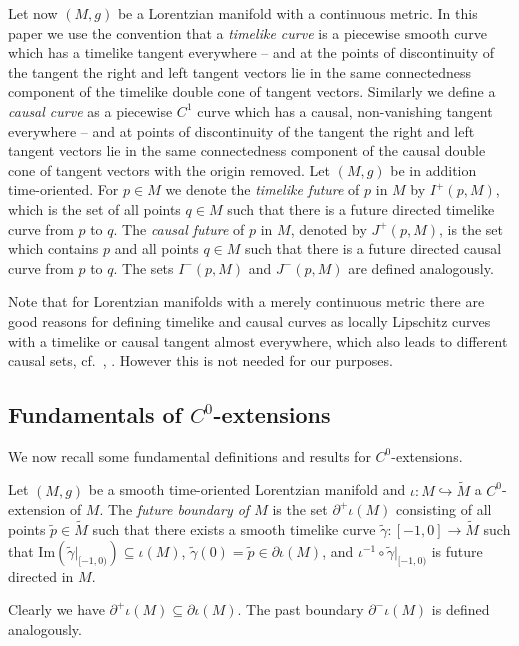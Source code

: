 \documentclass[reqno]{article}
\begin{document}
Let now $(M,g)$ be a Lorentzian manifold with a continuous metric. In this paper we use the convention that a \emph{timelike curve} is a piecewise smooth curve which has a timelike tangent everywhere -- and at the points of discontinuity of the tangent the right and left tangent vectors lie in the same connectedness component of the timelike double cone of tangent vectors. Similarly we define a \emph{causal curve} as a piecewise $C^1$ curve which has a causal, non-vanishing tangent everywhere -- and at points of discontinuity of the tangent the right and left tangent vectors lie in the same connectedness component of the causal double cone of tangent vectors with the origin removed. Let $(M,g)$ be in addition time-oriented. For $p \in M$ we denote the \emph{timelike future} of $p$ in $M$ by  $I^+(p,M)$, which is  the set of all points $q \in M$ such that there is a future directed timelike curve  from $p$ to $q$. The \emph{causal future} of $p$ in $M$, denoted by $J^+(p,M)$, is the set which contains $p$ and all points $q \in M$ such that there is a future directed causal curve from $p$ to $q$. The sets $I^-(p,M)$ and $J^-(p,M)$ are defined analogously.

Note that for Lorentzian manifolds with a merely continuous metric there are  good reasons for defining timelike and causal curves as locally Lipschitz curves with a timelike or causal tangent almost everywhere, which also leads to different causal sets, cf.\ \cite{ChrusGra12}, \cite{GraKuSaSt19}. However this is not needed for our purposes.



\subsection{Fundamentals of $C^0$-extensions} \label{SecFundResults}



We now recall some fundamental definitions and results for $C^0$-extensions. 

\begin{definition}
Let $(M,g)$ be a smooth time-oriented Lorentzian manifold and $\iota : M \hookrightarrow \tilde{M}$ a $C^0$-extension of $M$. The \emph{future boundary of $M$} is the set $\partial^+\iota(M) $ consisting of all points $\tilde{p} \in \tilde{M}$ such that there exists a smooth timelike curve $\tilde{\gamma} : [-1,0] \to \tilde{M}$ such that $\mathrm{Im}(\tilde{\gamma}|_{[-1,0)}) \subseteq \iota(M)$, $\tilde{\gamma}(0) = \tilde{p} \in \partial \iota(M)$, and $\iota^{-1} \circ \tilde{\gamma}|_{[-1,0)}$ is future directed in $M$.
\end{definition}
Clearly we have $\partial^+\iota(M) \subseteq \partial \iota(M)$. The past boundary $\partial^- \iota(M)$ is defined analogously. 
\end{document}

